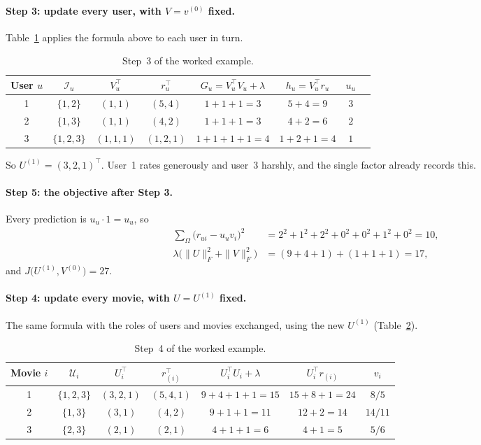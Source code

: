 \documentclass[11pt]{article}
\theoremstyle{definition}
\newcommand{\T}{^{\top}}
\newcommand{\Iu}{\mathcal{I}_u}
\newcommand{\Ui}{\mathcal{U}_i}
\begin{document}
\paragraph{Step 3: update every user, with $V = v^{(0)}$ fixed.} Table~\ref{tab:ex-users} applies
the formula above to each user in turn.

\begin{table}[H]
\centering
\begin{tabular}{@{}cccccccc@{}}
\toprule
User $u$ & $\Iu$ & $V_u\T$ & $r_u\T$ & $G_u = V_u\T V_u + \lambda$ & $h_u = V_u\T r_u$ & $u_u$ \\
\midrule
1 & $\{1,2\}$   & $(1,1)$   & $(5,4)$   & $1+1+1 = 3$   & $5+4 = 9$     & $3$ \\
2 & $\{1,3\}$   & $(1,1)$   & $(4,2)$   & $1+1+1 = 3$   & $4+2 = 6$     & $2$ \\
3 & $\{1,2,3\}$ & $(1,1,1)$ & $(1,2,1)$ & $1+1+1+1 = 4$ & $1+2+1 = 4$   & $1$ \\
\bottomrule
\end{tabular}
\caption{Step~3 of the worked example.}
\label{tab:ex-users}
\end{table}

So $U^{(1)} = (3, 2, 1)\T$. User~1 rates generously and user~3 harshly, and the single factor
already records this.

\paragraph{Step 5: the objective after Step 3.} Every prediction is $u_u \cdot 1 = u_u$, so
\begin{align*}
\textstyle\sum_{\Omega}\bigl(r_{ui} - u_u v_i\bigr)^2 &= 2^2 + 1^2 + 2^2 + 0^2 + 0^2 + 1^2 + 0^2 = 10,\\
\lambda\bigl(\|U\|_F^2 + \|V\|_F^2\bigr) &= (9 + 4 + 1) + (1 + 1 + 1) = 17,
\end{align*}
and $J\bigl(U^{(1)}, V^{(0)}\bigr) = 27$.

\paragraph{Step 4: update every movie, with $U = U^{(1)}$ fixed.} The same formula with the roles
of users and movies exchanged, using the new $U^{(1)}$ (Table~\ref{tab:ex-movies}).

\begin{table}[H]
\centering
\begin{tabular}{@{}ccccccc@{}}
\toprule
Movie $i$ & $\Ui$ & $U_i\T$ & $r_{(i)}\T$ & $U_i\T U_i + \lambda$ & $U_i\T r_{(i)}$ & $v_i$ \\
\midrule
1 & $\{1,2,3\}$ & $(3,2,1)$ & $(5,4,1)$ & $9+4+1+1 = 15$ & $15+8+1 = 24$ & $8/5$ \\
2 & $\{1,3\}$   & $(3,1)$   & $(4,2)$   & $9+1+1 = 11$   & $12+2 = 14$   & $14/11$ \\
3 & $\{2,3\}$   & $(2,1)$   & $(2,1)$   & $4+1+1 = 6$    & $4+1 = 5$     & $5/6$ \\
\bottomrule
\end{tabular}
\caption{Step~4 of the worked example.}
\label{tab:ex-movies}
\end{table}
\end{document}

